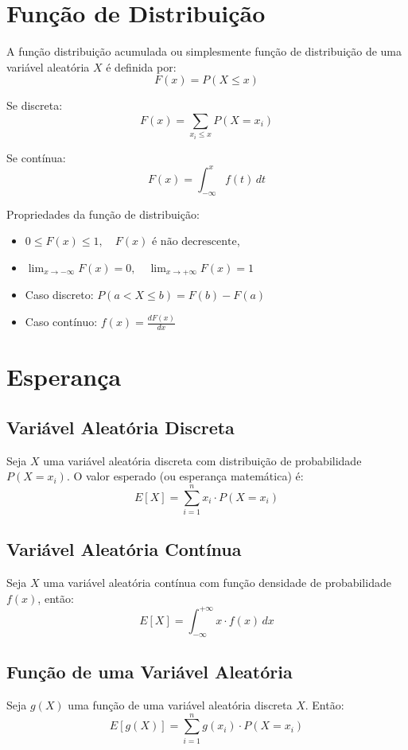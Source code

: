 \documentclass{article}
\begin{document}
\section{Função de Distribuição}
A função distribuição acumulada ou simplesmente função de distribuição de uma variável aleatória $X$ é definida por:
    $$
    F(x) = P(X \leq x)
    $$

Se discreta:
    $$
    F(x) = \sum_{x_i \leq x} P(X = x_i)
    $$

Se contínua:
    $$
    F(x) = \int_{-\infty}^{x} f(t) \, dt
    $$

Propriedades da função de distribuição:
\begin{itemize}
    \item $0 \leq F(x) \leq 1, \quad F(x) \text{ é não decrescente}$,
    \item $\lim_{x \to -\infty} F(x) = 0, \quad \lim_{x \to +\infty} F(x) = 1$
    \item Caso discreto: $P(a < X \leq b) = F(b) - F(a)$
    \item Caso contínuo: $f(x) = \frac{dF(x)}{dx}$
\end{itemize}

\section{Esperança}
\subsection{Variável Aleatória Discreta}
Seja $X$ uma variável aleatória discreta com distribuição de probabilidade $P(X = x_i)$. O valor esperado (ou esperança matemática) é:
    $$
    E[X] = \sum_{i=1}^{n} x_i \cdot P(X = x_i)
    $$

\subsection{Variável Aleatória Contínua}
Seja $X$ uma variável aleatória contínua com função densidade de probabilidade $f(x)$, então:
    $$
    E[X] = \int_{-\infty}^{+\infty} x \cdot f(x) \, dx
    $$

\subsection{Função de uma Variável Aleatória}
Seja $g(X)$ uma função de uma variável aleatória discreta $X$. Então:
    $$
    E[g(X)] = \sum_{i=1}^{n} g(x_i) \cdot P(X = x_i)
    $$
\end{document}
